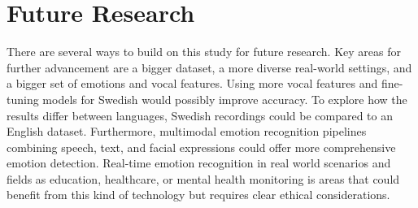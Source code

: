 \section{Future Research}
\label{sec:con-future}
There are several ways to build on this study for future research. 
Key areas for further advancement are a bigger dataset, a more diverse real-world settings, and a bigger set of emotions and vocal features. Using more vocal features and fine-tuning models for Swedish would possibly improve accuracy. To explore how the results differ between languages, Swedish recordings could be compared to an English dataset. Furthermore, multimodal emotion recognition pipelines combining speech, text, and facial expressions could offer more comprehensive emotion detection. 
Real-time emotion recognition in real world scenarios and fields as education, healthcare, or mental health monitoring is areas that could benefit from this kind of technology but requires clear ethical considerations. 
